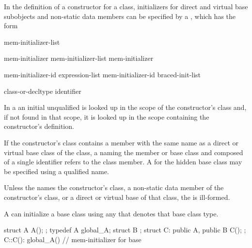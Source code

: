 \pnum
In the definition of a constructor for a class,
initializers for direct and virtual base subobjects and
non-static data members can be specified by a
,
which has the form

\begin{bnf}
\br
    \terminal{:} mem-initializer-list
\end{bnf}

\begin{bnf}
\br
    mem-initializer \opt\br
    mem-initializer-list \terminal{,} mem-initializer \opt
\end{bnf}

\begin{bnf}
\br
    mem-initializer-id \terminal{(} expression-list\opt{} \terminal{)}\br
    mem-initializer-id braced-init-list
\end{bnf}

\begin{bnf}
\br
    class-or-decltype\br
    identifier
\end{bnf}

\pnum
In a  an initial unqualified
 is looked up in the scope of the constructor's class
and, if not found in that scope, it is looked up in the scope containing the
constructor's definition.
\begin{note}
If the constructor's class contains a member with the same name as a direct
or virtual base class of the class, a
naming the member or base class and composed of a single identifier
refers to the class member.
A
for the hidden base class may be specified using a qualified name.
\end{note}
Unless the
names the constructor's class,
a non-static data member of the constructor's class, or
a direct or virtual base of that class,
the
is ill-formed.

\pnum
A
can initialize a base class using any  that denotes that base class type.
\begin{example}

\begin{codeblock}
struct A { A(); };
typedef A global_A;
struct B { };
struct C: public A, public B { C(); };
C::C(): global_A() { }          // mem-initializer for base 
\end{codeblock}
\end{example}

